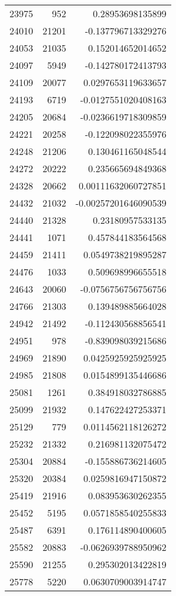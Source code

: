\begin{tabular}{r | r | r}
23975 & 952 & 0.28953698135899 \\
24010 & 21201 & -0.137796713329276 \\
24053 & 21035 & 0.152014652014652 \\
24097 & 5949 & -0.142780172413793 \\
24109 & 20077 & 0.0297653119633657 \\
24193 & 6719 & -0.0127551020408163 \\
24205 & 20684 & -0.0236619718309859 \\
24221 & 20258 & -0.122098022355976 \\
24248 & 21206 & 0.130461165048544 \\
24272 & 20222 & 0.235665694849368 \\
24328 & 20662 & 0.00111632060727851 \\
24432 & 21032 & -0.00257201646090539 \\
24440 & 21328 & 0.23180957533135 \\
24441 & 1071 & 0.457844183564568 \\
24459 & 21411 & 0.0549738219895287 \\
24476 & 1033 & 0.509698996655518 \\
24643 & 20060 & -0.0756756756756756 \\
24766 & 21303 & 0.139489885664028 \\
24942 & 21492 & -0.112430568856541 \\
24951 & 978 & -0.839098039215686 \\
24969 & 21890 & 0.0425925925925925 \\
24985 & 21808 & 0.0154899135446686 \\
25081 & 1261 & 0.384918032786885 \\
25099 & 21932 & 0.147622427253371 \\
25129 & 779 & 0.0114562118126272 \\
25232 & 21332 & 0.216981132075472 \\
25304 & 20884 & -0.155886736214605 \\
25320 & 20384 & 0.0259816947150872 \\
25419 & 21916 & 0.083953630262355 \\
25452 & 5195 & 0.0571858540255833 \\
25487 & 6391 & 0.176114890400605 \\
25582 & 20883 & -0.0626939788950962 \\
25590 & 21255 & 0.295302013422819 \\
25778 & 5220 & 0.0630709003914747 \\

\end{tabular}
